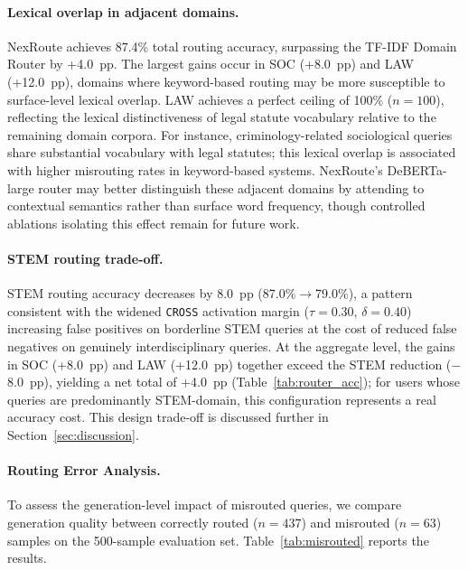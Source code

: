 \documentclass[a4paper,fleql,doubleblind]{cas-sc}
\begin{document}
\paragraph{Lexical overlap in adjacent domains.}
NexRoute achieves 87.4\% total routing accuracy, surpassing the
TF-IDF Domain Router by +4.0~pp. The largest gains occur in SOC (+8.0~pp) and LAW
(+12.0~pp), domains where keyword-based routing may be more susceptible to
surface-level lexical overlap. LAW achieves a perfect ceiling of 100\% ($n{=}100$),
reflecting the lexical distinctiveness of legal statute vocabulary relative to the
remaining domain corpora. For instance, criminology-related sociological
queries share substantial vocabulary with legal statutes; this lexical
overlap is associated with higher misrouting rates in keyword-based systems.
NexRoute's DeBERTa-large router may better distinguish these adjacent domains
by attending to contextual semantics rather than surface word frequency,
though controlled ablations isolating this effect remain for future work.

\paragraph{STEM routing trade-off.}
STEM routing accuracy decreases by 8.0~pp (87.0\%$\to$79.0\%), a pattern
consistent with the widened \texttt{CROSS} activation margin ($\tau{=}0.30$,
$\delta{=}0.40$) increasing false positives on borderline STEM queries at
the cost of reduced false negatives on genuinely interdisciplinary queries.
At the aggregate level, the gains in SOC (+8.0~pp) and LAW (+12.0~pp) together
exceed the STEM reduction ($-$8.0~pp), yielding a net total of +4.0~pp
(Table~\ref{tab:router_acc}); for users whose queries are predominantly
STEM-domain, this configuration represents a real accuracy cost. This design trade-off is discussed further in
Section~\ref{sec:discussion}.

\paragraph{Routing Error Analysis.}
To assess the generation-level impact of misrouted queries, we compare
generation quality between correctly routed ($n{=}437$) and misrouted
($n{=}63$) samples on the 500-sample evaluation set.
Table~\ref{tab:misrouted} reports the results.
\end{document}
